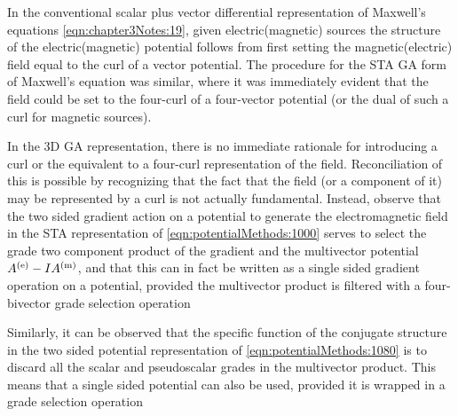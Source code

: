 %
%

In the conventional scalar plus vector differential representation of Maxwell's equations \cref{eqn:chapter3Notes:19}, given electric(magnetic) sources the structure of the electric(magnetic) potential follows from first setting the magnetic(electric) field equal to the curl of a vector potential.  The procedure for the STA GA form of Maxwell's equation was similar, where it was immediately evident that the field could be set to the four-curl of a four-vector potential (or the dual of such a curl for magnetic sources).

In the 3D GA representation, there is no immediate rationale for introducing a curl or the equivalent to a four-curl representation of the field.  Reconciliation of this is possible by recognizing that the fact that the field (or a component of it) may be represented by a curl is not actually fundamental.  Instead, observe that the two sided gradient action on a potential to generate the electromagnetic field in the STA representation of \cref{eqn:potentialMethods:1000} serves to select the grade two component product of the gradient and the multivector potential \( {A^{(\mathrm{e})}} - I {A^{(\mathrm{m})}} \), and that this can in fact be written as
a single sided gradient operation on a potential, provided the multivector product is filtered with a four-bivector grade selection operation


Similarly, it can be observed that the
specific function of the conjugate structure in the two sided potential representation of
\cref{eqn:potentialMethods:1080}
is to discard all the scalar and pseudoscalar grades in the multivector product.  This means that a single sided potential can also be used, provided it is wrapped in a grade selection operation


